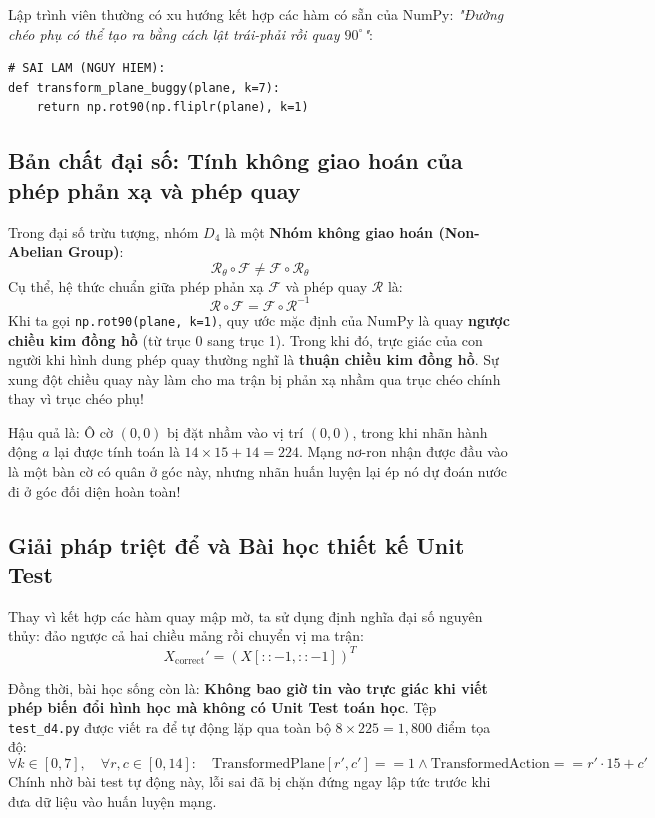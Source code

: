 \documentclass[11pt,a4paper]{report}
\begin{document}
Lập trình viên thường có xu hướng kết hợp các hàm có sẵn của NumPy: \textit{"Đường chéo phụ có thể tạo ra bằng cách lật trái-phải rồi quay $90^\circ$"}:
\begin{lstlisting}[caption={Đoạn mã ngây thơ dẫn đến sai lệch $100\%$ nhãn hành động.}]
# SAI LAM (NGUY HIEM):
def transform_plane_buggy(plane, k=7):
    return np.rot90(np.fliplr(plane), k=1)
\end{lstlisting}

\subsection{Bản chất đại số: Tính không giao hoán của phép phản xạ và phép quay}
Trong đại số trừu tượng, nhóm $D_4$ là một \textbf{Nhóm không giao hoán (Non-Abelian Group)}:
\begin{equation}
    \mathcal{R}_{\theta} \circ \mathcal{F} \neq \mathcal{F} \circ \mathcal{R}_{\theta}
\end{equation}
Cụ thể, hệ thức chuẩn giữa phép phản xạ $\mathcal{F}$ và phép quay $\mathcal{R}$ là:
\begin{equation}
    \mathcal{R} \circ \mathcal{F} = \mathcal{F} \circ \mathcal{R}^{-1}
\end{equation}
Khi ta gọi \texttt{np.rot90(plane, k=1)}, quy ước mặc định của NumPy là quay \textbf{ngược chiều kim đồng hồ} (từ trục 0 sang trục 1). Trong khi đó, trực giác của con người khi hình dung phép quay thường nghĩ là \textbf{thuận chiều kim đồng hồ}. Sự xung đột chiều quay này làm cho ma trận bị phản xạ nhầm qua trục chéo chính thay vì trục chéo phụ!

Hậu quả là: Ô cờ $(0, 0)$ bị đặt nhầm vào vị trí $(0, 0)$, trong khi nhãn hành động $a$ lại được tính toán là $14 \times 15 + 14 = 224$. Mạng nơ-ron nhận được đầu vào là một bàn cờ có quân ở góc này, nhưng nhãn huấn luyện lại ép nó dự đoán nước đi ở góc đối diện hoàn toàn!

\subsection{Giải pháp triệt để và Bài học thiết kế Unit Test}
Thay vì kết hợp các hàm quay mập mờ, ta sử dụng định nghĩa đại số nguyên thủy: đảo ngược cả hai chiều mảng rồi chuyển vị ma trận:
\begin{equation}
    X_{\text{correct}}' = (X[::-1, ::-1])^T
\end{equation}

Đồng thời, bài học sống còn là: \textbf{Không bao giờ tin vào trực giác khi viết phép biến đổi hình học mà không có Unit Test toán học}. Tệp \texttt{test\_d4.py} được viết ra để tự động lặp qua toàn bộ $8 \times 225 = 1,800$ điểm tọa độ:
\begin{equation}
    \forall k \in [0, 7], \quad \forall r, c \in [0, 14]: \quad \text{TransformedPlane}[r', c'] == 1 \land \text{TransformedAction} == r' \cdot 15 + c'
\end{equation}
Chính nhờ bài test tự động này, lỗi sai đã bị chặn đứng ngay lập tức trước khi đưa dữ liệu vào huấn luyện mạng.
\end{document}
